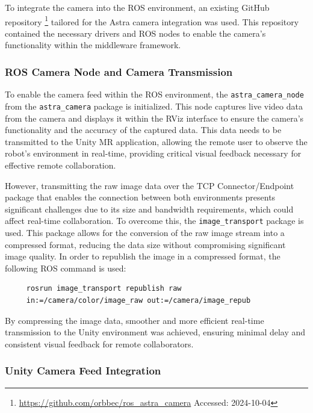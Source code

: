 To integrate the camera into the \ac{ROS} environment, an existing GitHub repository \footnote{\url{https://github.com/orbbec/ros_astra_camera} Accessed: 2024-10-04} tailored for the Astra camera integration was used. This repository contained the necessary drivers and \ac{ROS} nodes to enable the camera's functionality within the middleware framework.


\subsubsection{ROS Camera Node and Camera Transmission}

To enable the camera feed within the \ac{ROS} environment, the \texttt{astra\_camera\_node} from the \texttt{astra\_camera} package is initialized. This node captures live video data from the camera and displays it within the RViz interface to ensure the camera’s functionality and the accuracy of the captured data. This data needs to be transmitted to the Unity \ac{MR} application, allowing the remote user to observe the robot's environment in real-time, providing critical visual feedback necessary for effective remote collaboration.

However, transmitting the raw image data over the \ac{TCP} Connector/Endpoint package that enables the connection between both environments presents significant challenges due to its size and bandwidth requirements, which could affect real-time collaboration.
To overcome this, the \texttt{image\_transport} package is used. This package allows for the conversion of the raw image stream into a compressed format, reducing the data size without compromising significant image quality. In order to republish the image in a compressed format, the following \ac{ROS} command is used:

\begin{verbatim}
     rosrun image_transport republish raw 
     in:=/camera/color/image_raw out:=/camera/image_repub 
\end{verbatim}

By compressing the image data, smoother and more efficient real-time transmission to the Unity environment was achieved, ensuring minimal delay and consistent visual feedback for remote collaborators.

\subsubsection{Unity Camera Feed Integration}

